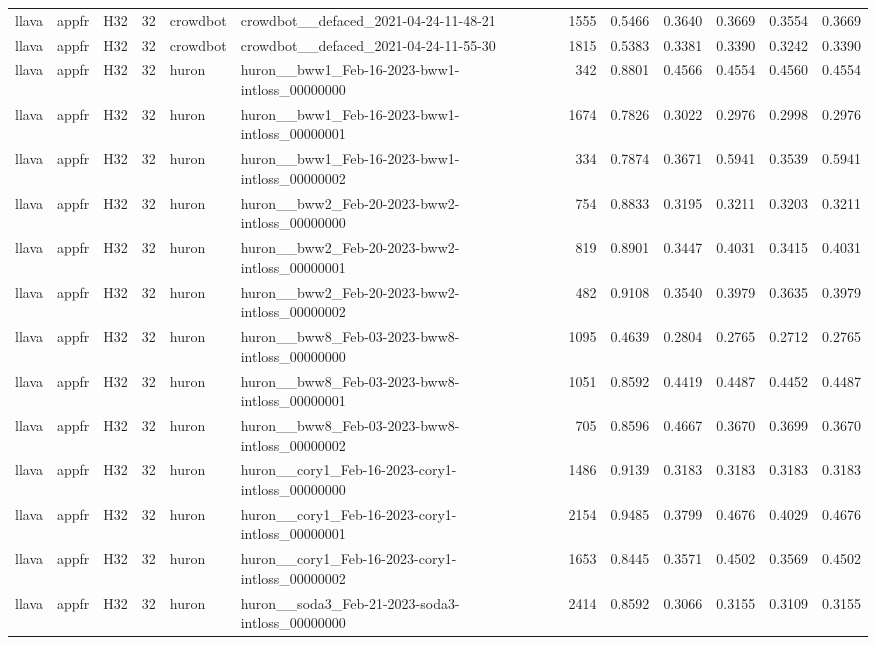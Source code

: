 \begin{table}[tbp]
\begin{tabular}{lllrllrrrrrr}
llava & appfr & H32 & 32 & crowdbot & crowdbot\_\_defaced\_2021-04-24-11-48-21 & 1555 & 0.5466 & 0.3640 & 0.3669 & 0.3554 & 0.3669 \\
llava & appfr & H32 & 32 & crowdbot & crowdbot\_\_defaced\_2021-04-24-11-55-30 & 1815 & 0.5383 & 0.3381 & 0.3390 & 0.3242 & 0.3390 \\
llava & appfr & H32 & 32 & huron & huron\_\_bww1\_Feb-16-2023-bww1-intloss\_00000000 & 342 & 0.8801 & 0.4566 & 0.4554 & 0.4560 & 0.4554 \\
llava & appfr & H32 & 32 & huron & huron\_\_bww1\_Feb-16-2023-bww1-intloss\_00000001 & 1674 & 0.7826 & 0.3022 & 0.2976 & 0.2998 & 0.2976 \\
llava & appfr & H32 & 32 & huron & huron\_\_bww1\_Feb-16-2023-bww1-intloss\_00000002 & 334 & 0.7874 & 0.3671 & 0.5941 & 0.3539 & 0.5941 \\
llava & appfr & H32 & 32 & huron & huron\_\_bww2\_Feb-20-2023-bww2-intloss\_00000000 & 754 & 0.8833 & 0.3195 & 0.3211 & 0.3203 & 0.3211 \\
llava & appfr & H32 & 32 & huron & huron\_\_bww2\_Feb-20-2023-bww2-intloss\_00000001 & 819 & 0.8901 & 0.3447 & 0.4031 & 0.3415 & 0.4031 \\
llava & appfr & H32 & 32 & huron & huron\_\_bww2\_Feb-20-2023-bww2-intloss\_00000002 & 482 & 0.9108 & 0.3540 & 0.3979 & 0.3635 & 0.3979 \\
llava & appfr & H32 & 32 & huron & huron\_\_bww8\_Feb-03-2023-bww8-intloss\_00000000 & 1095 & 0.4639 & 0.2804 & 0.2765 & 0.2712 & 0.2765 \\
llava & appfr & H32 & 32 & huron & huron\_\_bww8\_Feb-03-2023-bww8-intloss\_00000001 & 1051 & 0.8592 & 0.4419 & 0.4487 & 0.4452 & 0.4487 \\
llava & appfr & H32 & 32 & huron & huron\_\_bww8\_Feb-03-2023-bww8-intloss\_00000002 & 705 & 0.8596 & 0.4667 & 0.3670 & 0.3699 & 0.3670 \\
llava & appfr & H32 & 32 & huron & huron\_\_cory1\_Feb-16-2023-cory1-intloss\_00000000 & 1486 & 0.9139 & 0.3183 & 0.3183 & 0.3183 & 0.3183 \\
llava & appfr & H32 & 32 & huron & huron\_\_cory1\_Feb-16-2023-cory1-intloss\_00000001 & 2154 & 0.9485 & 0.3799 & 0.4676 & 0.4029 & 0.4676 \\
llava & appfr & H32 & 32 & huron & huron\_\_cory1\_Feb-16-2023-cory1-intloss\_00000002 & 1653 & 0.8445 & 0.3571 & 0.4502 & 0.3569 & 0.4502 \\
llava & appfr & H32 & 32 & huron & huron\_\_soda3\_Feb-21-2023-soda3-intloss\_00000000 & 2414 & 0.8592 & 0.3066 & 0.3155 & 0.3109 & 0.3155 \\

\end{tabular}
\end{table}
